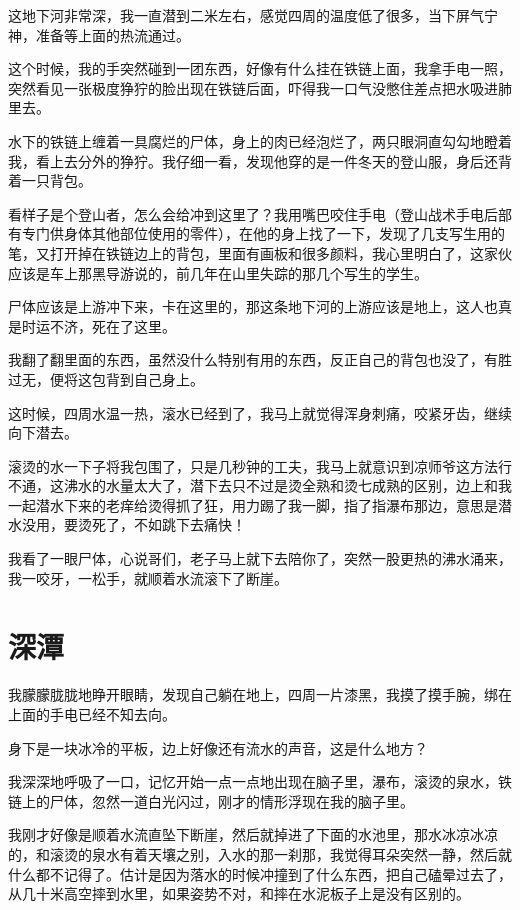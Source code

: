 这地下河非常深，我一直潜到二米左右，感觉四周的温度低了很多，当下屏气宁神，准备等上面的热流通过。

这个时候，我的手突然碰到一团东西，好像有什么挂在铁链上面，我拿手电一照，突然看见一张极度狰狞的脸出现在铁链后面，吓得我一口气没憋住差点把水吸进肺里去。

水下的铁链上缠着一具腐烂的尸体，身上的肉已经泡烂了，两只眼洞直勾勾地瞪着我，看上去分外的狰狞。我仔细一看，发现他穿的是一件冬天的登山服，身后还背着一只背包。

看样子是个登山者，怎么会给冲到这里了？我用嘴巴咬住手电（登山战术手电后部有专门供身体其他部位使用的零件），在他的身上找了一下，发现了几支写生用的笔，又打开掉在铁链边上的背包，里面有画板和很多颜料，我心里明白了，这家伙应该是车上那黑导游说的，前几年在山里失踪的那几个写生的学生。

尸体应该是上游冲下来，卡在这里的，那这条地下河的上游应该是地上，这人也真是时运不济，死在了这里。

我翻了翻里面的东西，虽然没什么特别有用的东西，反正自己的背包也没了，有胜过无，便将这包背到自己身上。

这时候，四周水温一热，滚水已经到了，我马上就觉得浑身刺痛，咬紧牙齿，继续向下潜去。

滚烫的水一下子将我包围了，只是几秒钟的工夫，我马上就意识到凉师爷这方法行不通，这沸水的水量太大了，潜下去只不过是烫全熟和烫七成熟的区别，边上和我一起潜水下来的老痒给烫得抓了狂，用力踢了我一脚，指了指瀑布那边，意思是潜水没用，要烫死了，不如跳下去痛快！

我看了一眼尸体，心说哥们，老子马上就下去陪你了，突然一股更热的沸水涌来，我一咬牙，一松手，就顺着水流滚下了断崖。

\chapter{深潭}

我朦朦胧胧地睁开眼睛，发现自己躺在地上，四周一片漆黑，我摸了摸手腕，绑在上面的手电已经不知去向。

身下是一块冰冷的平板，边上好像还有流水的声音，这是什么地方？

我深深地呼吸了一口，记忆开始一点一点地出现在脑子里，瀑布，滚烫的泉水，铁链上的尸体，忽然一道白光闪过，刚才的情形浮现在我的脑子里。

我刚才好像是顺着水流直坠下断崖，然后就掉进了下面的水池里，那水冰凉冰凉的，和滚烫的泉水有着天壤之别，入水的那一刹那，我觉得耳朵突然一静，然后就什么都不记得了。估计是因为落水的时候冲撞到了什么东西，把自己磕晕过去了，从几十米高空摔到水里，如果姿势不对，和摔在水泥板子上是没有区别的。

